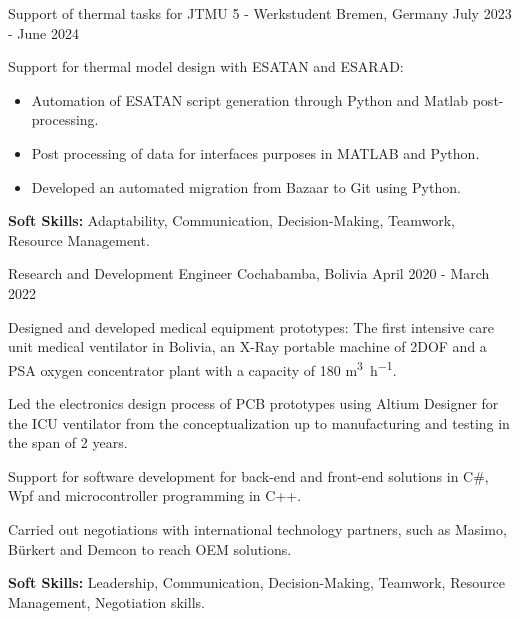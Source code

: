 

\begin{cventries}
  {Support of thermal tasks for JTMU 5 - Werkstudent}
  {Bremen, Germany}
  {July 2023 - June 2024}
  {
    \begin{cvitems}
      \item Support for thermal model design with ESATAN and ESARAD:
      \begin{itemize}
        \item[\checkmark] Automation of ESATAN script generation
        through Python and Matlab post-processing.
        \item[\checkmark] Post processing of data for interfaces
        purposes in MATLAB and Python.
        \item[\checkmark] Developed an automated migration from
        Bazaar to Git using Python.
      \end{itemize}
      \item \textbf{Soft Skills:} Adaptability, Communication,
      Decision-Making, Teamwork, Resource Management.
    \end{cvitems}
  }

    {Research and Development Engineer}
    {Cochabamba, Bolivia}
    {April 2020 - March 2022}
    {
      \begin{cvitems}
        \item Designed and developed medical equipment prototypes: The
        first intensive care unit medical ventilator in Bolivia, an
        X-Ray portable machine of 2DOF and a PSA oxygen concentrator
        plant with a capacity of 180 \unit{m^{3}.h^{-1}}.
        \item Led the electronics design process of PCB prototypes
        using Altium Designer for the ICU ventilator from the
        conceptualization up to manufacturing and testing in the span
        of 2 years.
        \item Support for software development for back-end and
        front-end solutions in C\#, Wpf and microcontroller
        programming in C++.
        \item Carried out negotiations with international technology
        partners, such as Masimo, B\"urkert and Demcon to reach OEM
        solutions.
        \item \textbf{Soft Skills:} Leadership, Communication,
        Decision-Making, Teamwork, Resource Management, Negotiation
        skills.
      \end{cvitems}
    }


\end{cventries}
